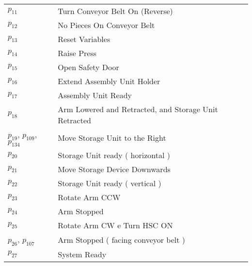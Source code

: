 \begin{longtable}{m{5cm}m{5cm}}
\hyperlink{completeNet:p11}{\hypertarget{completeTable:p11}{$p_{11}$}} & Turn Conveyor Belt On (Reverse)\\
\hyperlink{completeNet:p12}{\hypertarget{completeTable:p12}{$p_{12}$}} & No Pieces On Conveyor Belt\\
\hyperlink{completeNet:p13}{\hypertarget{completeTable:p13}{$p_{13}$}} & Reset Variables\\
\hyperlink{completeNet:p14}{\hypertarget{completeTable:p14}{$p_{14}$}} & Raise Press\\
\hyperlink{completeNet:p15}{\hypertarget{completeTable:p15}{$p_{15}$}} & Open Safety Door\\
\hyperlink{completeNet:p16}{\hypertarget{completeTable:p16}{$p_{16}$}} & Extend Assembly Unit Holder\\
\hyperlink{completeNet:p17}{\hypertarget{completeTable:p17}{$p_{17}$}} & Assembly Unit Ready\\
\hyperlink{completeNet:p18}{\hypertarget{completeTable:p18}{$p_{18}$}} & Arm Lowered and Retracted, and Storage Unit Retracted\\
\hyperlink{completeNet:p19}{\hypertarget{completeTable:p19}{$p_{19}$}}, \hyperlink{completeNet:p109}{\hypertarget{completeTable:p109}{$p_{109}$}}, \hyperlink{completeNet:p134}{\hypertarget{completeTable:p134}{$p_{134}$}} & Move Storage Unit to the Right\\
\hyperlink{completeNet:p20}{\hypertarget{completeTable:p20}{$p_{20}$}} & Storage Unit ready ( horizontal )\\
\hyperlink{completeNet:p21}{\hypertarget{completeTable:p21}{$p_{21}$}} & Move Storage Device Downwards\\
\hyperlink{completeNet:p22}{\hypertarget{completeTable:p22}{$p_{22}$}} & Storage Unit ready ( vertical )\\
\hyperlink{completeNet:p23}{\hypertarget{completeTable:p23}{$p_{23}$}} & Rotate Arm CCW\\
\hyperlink{completeNet:p24}{\hypertarget{completeTable:p24}{$p_{24}$}} & Arm Stopped\\
\hyperlink{completeNet:p25}{\hypertarget{completeTable:p25}{$p_{25}$}} & Rotate Arm CW e Turn HSC ON\\
\hyperlink{completeNet:p26}{\hypertarget{completeTable:p26}{$p_{26}$}}, \hyperlink{completeNet:p107}{\hypertarget{completeTable:p107}{$p_{107}$}} & Arm Stopped ( facing conveyor belt )\\
\hyperlink{completeNet:p27}{\hypertarget{completeTable:p27}{$p_{27}$}} & System Ready\\

\end{longtable}
